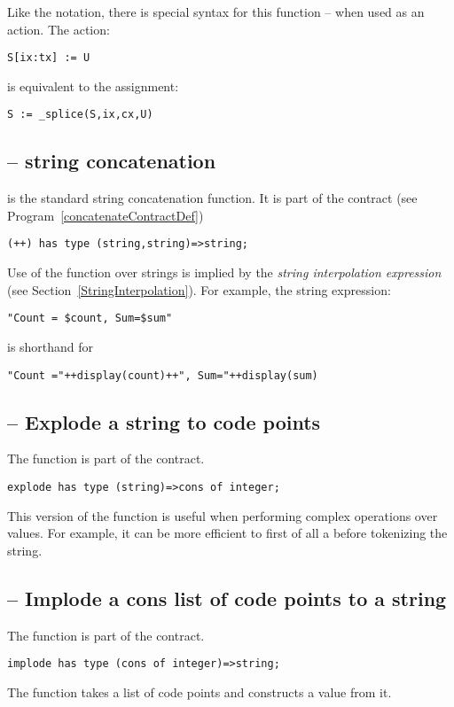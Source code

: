 Like the  notation, there is special syntax for this function -- when used as an action. The action:
\begin{lstlisting}
S[ix:tx] := U
\end{lstlisting}
is equivalent to the assignment:
\begin{lstlisting}
S := _splice(S,ix,cx,U)
\end{lstlisting}

\subsection{\q{++} -- string concatenation}
\label{stringConcatFunction}
\q{++} is the standard string concatenation function. It is part of the  contract (see Program~\vref{concatenateContractDef})
\begin{lstlisting}
(++) has type (string,string)=>string;
\end{lstlisting}

Use of the \q{++} function over strings is implied by the \emph{string interpolation expression} (see Section~\vref{StringInterpolation}). For example, the string expression:
\begin{lstlisting}
"Count = $count, Sum=$sum"
\end{lstlisting}
is shorthand for
\begin{lstlisting}
"Count ="++display(count)++", Sum="++display(sum)
\end{lstlisting}

\subsection{ -- Explode a string to code points}
\label{stringExplodeFunction}
The  function is part of the  contract.
\begin{lstlisting}
explode has type (string)=>cons of integer;
\end{lstlisting}
\begin{aside}
This version of the  function is useful when performing complex operations over  values. For example, it can be more efficient to first of all  a  before tokenizing the string.
\end{aside}

\subsection{ -- Implode a cons list of code points to a string}
\label{stringImplodeFunction}
The  function is part of the  contract.
\begin{lstlisting}
implode has type (cons of integer)=>string;
\end{lstlisting}
The  function takes a  list of  code points and constructs a  value from it.

